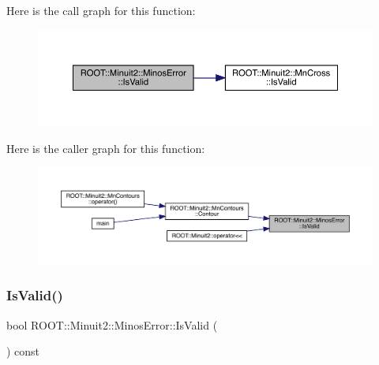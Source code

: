 Here is the call graph for this function\+:
\nopagebreak
\begin{figure}[H]
\begin{center}
\leavevmode
\includegraphics[width=350pt]{d2/dd1/classROOT_1_1Minuit2_1_1MinosError_af6b7accfe397a06417ecc1f989d82e00_cgraph}
\end{center}
\end{figure}
Here is the caller graph for this function\+:\nopagebreak
\begin{figure}[H]
\begin{center}
\leavevmode
\includegraphics[width=350pt]{d2/dd1/classROOT_1_1Minuit2_1_1MinosError_af6b7accfe397a06417ecc1f989d82e00_icgraph}
\end{center}
\end{figure}
\mbox{\label{classROOT_1_1Minuit2_1_1MinosError_af6b7accfe397a06417ecc1f989d82e00}} 
\subsubsection{\texorpdfstring{IsValid()}{IsValid()}\hspace{0.1cm}{\footnotesize\ttfamily [2/2]}}
{\footnotesize\ttfamily bool R\+O\+O\+T\+::\+Minuit2\+::\+Minos\+Error\+::\+Is\+Valid (\begin{DoxyParamCaption}{ }\end{DoxyParamCaption}) const\hspace{0.3cm}{\ttfamily [inline]}}

